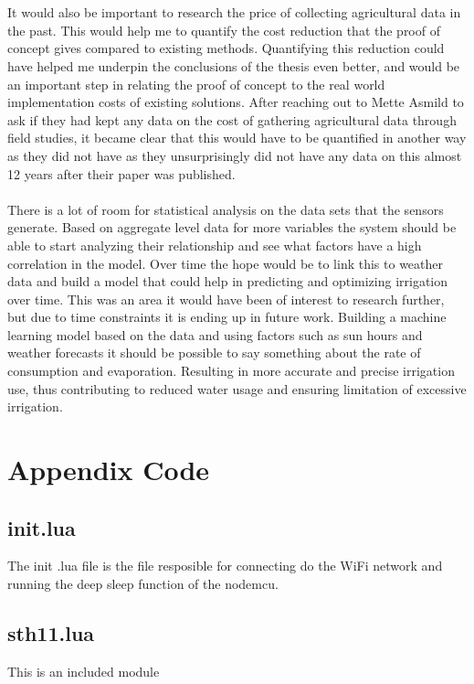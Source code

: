 \documentclass[]{uiophd}
\begin{document}
\\\\
It would also be important to research the price of collecting agricultural data in the past. This would help me to quantify the cost reduction that the proof of concept gives compared to existing methods. Quantifying this reduction could have helped me underpin the conclusions of the thesis even better, and would be an important step in relating the proof of concept to the real world implementation costs of existing solutions. After reaching out to Mette Asmild to ask if they had kept any data on the cost of gathering agricultural data through field studies, it became clear that this would have to be quantified in another way as they did not have as they unsurprisingly did not have any data on this almost 12 years after their paper was published.
\\\\
There is a lot of room for statistical analysis on the data sets that the sensors generate. Based on aggregate level data for more variables the system should be able to start analyzing their relationship and see what factors have a high correlation in the model. Over time the hope would be to link this to weather data and build a model that could help in predicting and optimizing irrigation over time. This was an area it would have been of interest to research further, but due to time constraints it is ending up in future work. Building a machine learning model based on the data and using factors such as sun hours and weather forecasts it should be possible to say something about the rate of consumption and evaporation. Resulting in more accurate and precise irrigation use, thus contributing to reduced water usage and ensuring limitation of excessive irrigation.


\printbibliography

\chapter*{Appendix Code}
\linespread{1}

\section*{init.lua}
The init .lua file is the file resposible for connecting do the WiFi network and running the deep sleep function of the nodemcu.


\section*{sth11.lua}
This is an included module \cite{sht11}

\end{document}
